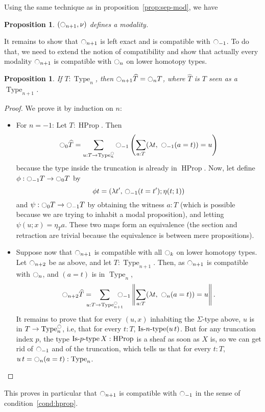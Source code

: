 \documentclass[preprint,9pt,numbers]{sigplanconf}
\newtheorem{prop}[thm]{Proposition}
\newcommand{\ie}{i.e,\xspace}
\DeclareMathOperator{\Type}{Type}
\DeclareMathOperator{\HProp}{HProp}
\def\mymathhyphen{{\hbox{-}}}
\newcommand{\IsType}[1]
{\mathop{\mathrm{Is\mymathhyphen}#1\mathrm{\mymathhyphen type}} }
\newcommand{\modal}{\ensuremath{\ocircle}}
\newenvironment{mymath}[1][-0em]{%
  \newcommand\mymathaux{\vspace{#1}}%
  \vspace{#1}%
  \begin{equation*}%
  }{ %
    \mymathaux%
  \end{equation*}}
\begin{document}
Using the same technique as in proposition~\ref{prop:sep-mod}, we have
\begin{prop}
  $(\modal_{n+1},\nu)$ defines a modality.
\end{prop}

It remains to show that $\modal_{n+1}$ is left exact and is compatible
with $\modal_{-1}$. To do that, we need to extend the notion of
compatibility and show that actually every modality $\modal_{n+1}$ is
compatible with $\modal_n$ on lower homotopy types.
\begin{prop}
  If $T:\Type_n$, then $\modal_{n+1} \widehat T = \modal_n T$, where $\widehat T$ is $T$ seen as a
  $\Type_{n+1}$.
\end{prop}
\begin{proof}
  We prove it by induction on $n$:
  \begin{itemize}
  \item For $n=-1$: Let $T:\HProp$. Then
    \begin{mymath}
      \modal_{0} \widehat T = \sum_{u:T \to \Type_n^\modal} \modal_{-1}\left( \sum_{a:T} 
      (\lambda t,~\modal_{-1} (a=t)) = u\right)
    \end{mymath}%
    because the type inside the truncation is already in $\HProp$.
    Now, let define $\phi : \modal_{-1} T \to \modal_0T$ by
    \begin{mymath}\phi t = (\lambda t',\, \modal_{-1}(t=t') ; \eta
    (t;1))\end{mymath}%
    and $\psi : \modal_0T\to \modal_{-1} T$ by obtaining the
    witness $a:T$ (which is possible because we are trying to inhabit
    a modal proposition), and letting $\psi (u;x) = \eta_T a$.
    These two maps form an equivalence (the section and retraction are
    trivial because the equivalence is between mere propositions).
  \item Suppose now that $\modal_{n+1}$ is compatible with all $\modal_k$ on
    lower homotopy types. Let $\modal_{n+2}$ be as above, and let
    $T:\Type_{n+1}$. Then, as $\modal_{n+1}$ is compatible with $\modal_{n}$, and
    $(a=t)$ is in $\Type_n$,
    \begin{mymath}
      \modal_{n+2} \widehat T= \hspace{-1em} \sum_{u:T \to
        \Type_{n+1}^\modal} 
      \hspace{-1em} \modal_{-1}\left\| \sum_{a:T} 
        (\lambda t,~\modal_{n} (a=t)) = u\right\|.
    \end{mymath}%
    It remains to prove that for every $(u,x)$ inhabiting the
    $\Sigma$-type above, $u$ is in $T\to\Type_n^\modal$, \ie that for
    every $t:T$, $\IsType n (u\, t)$.  But for any truncation index
    $p$,
    the type $\IsType p X:\HProp$ is a sheaf as soon as $X$ is, so we can get rid
    of $\modal_{-1}$ and of the truncation, which tells us that for
    every 
    $t:T$, $u\, t = \modal_n(a=t) : \Type_n$. \qedhere
  \end{itemize}
\end{proof}
This proves in particular that $\modal_{n+1}$ is compatible with
$\modal_{-1}$ in the sense of condition~\ref{cond:hprop}.
\end{document}
